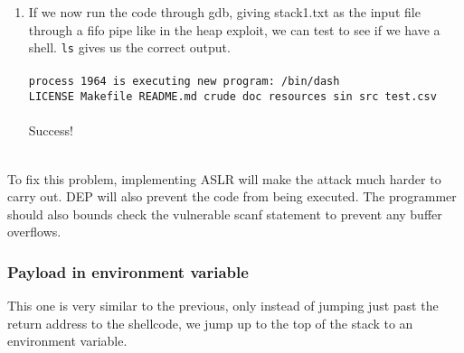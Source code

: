 \documentclass[]{article}
\begin{document}
\begin{enumerate}
	\\
	\\
	\item If we now run the code through gdb, giving stack1.txt as the input file through a fifo pipe like in the heap exploit, we can test to see if we have a shell. \texttt{ls} gives us the correct output.
	\\\\
	\texttt{process 1964 is executing new program: /bin/dash\\
		LICENSE  Makefile  README.md  crude  doc  resources  sin  src  test.csv}
	\\\\
	Success!
\end{enumerate}
\\
To fix this problem, implementing ASLR will make the attack much harder to carry out. DEP will also prevent the code from being executed. The programmer should also bounds check the vulnerable scanf statement to prevent any buffer overflows.

\subsubsection*{Payload in environment variable}
This one is very similar to the previous, only instead of jumping just past the return address to the shellcode, we jump up to the top of the stack to an environment variable.
\end{document}
